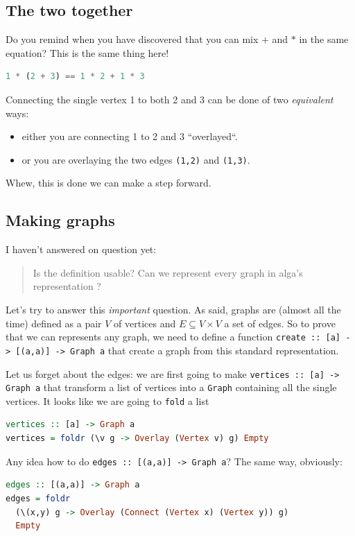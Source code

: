 \documentclass[10pt,a4paper]{article}
\begin{document}
\subsection{The two together}
Do you remind when you have discovered that you can mix $+$ and $*$ in the same equation? This is the same thing here!
\begin{lstlisting}[language=Haskell, frame=single]
1 * (2 + 3) == 1 * 2 + 1 * 3
\end{lstlisting}
Connecting the single vertex 1 to both 2 and 3 can be done of two \emph{equivalent} ways:
\begin{itemize}
	\item either you are connecting 1 to 2 and 3 ``overlayed``.
	\item or you are overlaying the two edges \verb|(1,2)| and \verb|(1,3)|.
\end{itemize}

Whew, this is done we can  make a step forward.

\subsection{Making graphs}
I haven't answered on question yet:
\begin{quote}
	Is the definition usable? Can we represent every graph in alga's representation ?
\end{quote}

Let's try to answer this \emph{important} question. As said, graphs are (almost all the time) defined as a pair $V$ of vertices and $E \subseteq V \times V$ a set of edges. So to prove that we can represents any graph, we need to define a function \verb|create :: [a] -> [(a,a)] -> Graph a| that create a graph from this standard representation.

Let us forget about the edges: we are first going to make \verb|vertices :: [a] -> Graph a| that transform a list of vertices into a \verb|Graph| containing all the single vertices. It looks like we are going to \verb|fold| a list

\begin{lstlisting}[language=Haskell, frame=single]
vertices :: [a] -> Graph a
vertices = foldr (\v g -> Overlay (Vertex v) g) Empty
\end{lstlisting}

Any idea how to do \verb|edges :: [(a,a)] -> Graph a|? The same way, obviously:

\begin{lstlisting}[language=Haskell, frame=single]
edges :: [(a,a)] -> Graph a
edges = foldr
  (\(x,y) g -> Overlay (Connect (Vertex x) (Vertex y)) g)
  Empty
\end{lstlisting}
\end{document}
